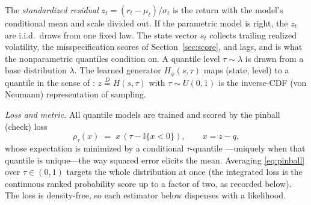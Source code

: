 \documentclass[11pt]{article}
\theoremstyle{remark}
\begin{document}
The \emph{standardized residual} $z_t = (r_t-\mu_t)/\sigma_t$ is the return with the model's conditional mean and scale divided out. If the parametric model is right, the $z_t$ are i.i.d.\ draws from one fixed law. The state vector $s_t$ collects trailing realized volatility, the misspecification scores of Section~\ref{sec:score}, and lags, and is what the nonparametric quantiles condition on. A quantile level $\tau \sim \lambda$ is drawn from a base distribution $\lambda$. The learned generator $H_\phi(s,\tau)$ maps (state, level) to a quantile in the sense of \citet{polson2023gbc}: $z \overset{D}{=} H(s,\tau)$ with $\tau\sim U(0,1)$ is the inverse-CDF (von Neumann) representation of sampling.

\noindent\emph{Loss and metric.} All quantile models are trained and
scored by the pinball (check) loss
\begin{equation}
\rho_\tau(x) \;=\; x\,(\tau - \mathbb{I}\{x<0\}),
\qquad x = z - q,
\label{eq:pinball}
\end{equation}
whose expectation is minimized by a conditional $\tau$-quantile
\citep{koenker1978, gneiting2011}---uniquely when that quantile is unique---the way squared
error elicits the mean. Averaging \eqref{eq:pinball} over $\tau\in(0,1)$
targets the whole distribution at once (the integrated loss is the
continuous ranked probability score up to a factor of two, as recorded
below). The loss is density-free, so each estimator below dispenses with a likelihood.
\end{document}
